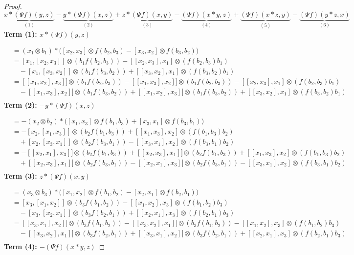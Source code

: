 \documentclass[a4paper, 12pt,oneside,reqno]{amsart}
\begin{document}
\begin{proof}
\[
 \underbrace{x \ast (\Psi f)(y,z)}_{(1)} -\underbrace{y \ast (\Psi f)(x,z)}_{(2)}+\underbrace{z \ast (\Psi f)(x,y)}_{(3)}- \underbrace{(\Psi f)(x \ast y, z)}_{(4)} + \underbrace{(\Psi f)(x\ast z, y )}_{(5)}-\underbrace{(\Psi f)(y\ast z, x )}_{(6)} 
\]
\textbf{Term (1): $x \ast (\Psi f)(y,z)$}

\begin{align*}
&= (x_1 \otimes b_1) \ast \Big([x_2 , x_3] \otimes f(b_2,b_3) - [x_3, x_2] \otimes f(b_3,b_2)\Big) \\
&= [x_1, [x_2 , x_3]] \otimes (b_1  f(b_2,b_3)) - [[x_2, x_3], x_1] \otimes ( f(b_2,b_3)b_1) \\
&\quad - [x_1, [x_3, x_2]] \otimes (b_1  f(b_3,b_2)) + [[x_3, x_2], x_1] \otimes (f(b_3,b_2)b_1)\\
&=[[x_1, x_2], x_3]] \otimes (b_1  f(b_2,b_3))-[[x_1, x_3], x_2]] \otimes (b_1  f(b_2,b_3)) - [[x_2, x_3],x_1] \otimes (f(b_2,b_3)b_1) \\
&\quad - [[x_1, x_3], x_2]] \otimes (b_1  f(b_3,b_2))+[[x_1, x_2], x_3]] \otimes (b_1  f(b_3,b_2)) + [[x_3, x_2], x_1] \otimes (f(b_3,b_2)b_1)\\
\end{align*}
\textbf{Term (2): $-y \ast (\Psi f)(x,z)$}

\begin{align*}
&= -(x_2 \otimes b_2) \ast \Big([x_1 , x_3] \otimes f(b_1,b_3) + [x_3, x_1] \otimes f(b_3,b_1)\Big) \\
&= -[x_2, [x_1, x_3]] \otimes (b_2  f(b_1,b_3)) + [[x_1, x_3], x_2] \otimes ( f(b_1,b_3)b_2) \\
&\quad + [x_2, [x_3, x_1]] \otimes (b_2  f(b_3,b_1)) - [[x_3, x_1], x_2] \otimes (f(b_3,b_1)b_2)\\
&= -[[x_2, x_1], x_3]] \otimes (b_2  f(b_1,b_3))+[[x_2, x_3], x_1]] \otimes (b_2  f(b_1,b_3)) + [[x_1, x_3], x_2] \otimes ( f(b_1,b_3)b_2) \\
&\quad + [[x_2, x_3], x_1]] \otimes (b_2  f(b_3,b_1))- [[x_2, x_1], x_3]] \otimes (b_2  f(b_3,b_1)) - [[x_3, x_1], x_2] \otimes (f(b_3,b_1)b_2)\\
\end{align*}
\textbf{Term (3): $z \ast (\Psi f)(x,y)$}

\begin{align*}
&= (x_3 \otimes b_3) \ast \Big([x_1 , x_2] \otimes f(b_1,b_2) -[x_2, x_1] \otimes f(b_2,b_1)\Big) \\
&= [x_3, [x_1, x_2]] \otimes (b_3  f(b_1,b_2)) - [[x_1, x_2], x_3] \otimes ( f(b_1,b_2)b_3) \\
&\quad - [x_3, [x_2, x_1]] \otimes (b_3  f(b_2,b_1)) + [[x_2, x_1], x_3] \otimes (f(b_2,b_1)b_3)\\
&= [[x_3, x_1], x_2]] \otimes (b_3  f(b_1,b_2))-[[x_3, x_2], x_1]] \otimes (b_3  f(b_1,b_2)) - [[x_1, x_2], x_3] \otimes ( f(b_1,b_2)b_3) \\
&\quad - [[x_3, x_2], x_1]] \otimes (b_3  f(b_2,b_1))+[[x_3, x_1], x_2]] \otimes (b_3  f(b_2,b_1)) + [[x_2, x_1], x_3] \otimes (f(b_2,b_1)b_3)\\
\end{align*}
\textbf{Term (4): $-(\Psi f)(x \ast y, z)$}


\end{proof}
\end{document}
